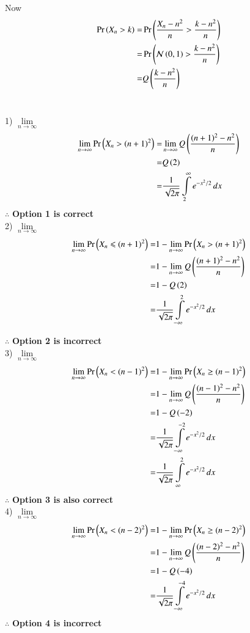 \documentclass[journal,12pt,twocolumn]{IEEEtran}
\begin{document}
Now 
{
\begin{align}
    \Pr\left(X_n>k\right) =& \Pr\left(\frac{X_n-n^2}{n}>\frac{k-n^2}{n}\right)
    \\=& \Pr\left(\mathcal{N}\left(0,1\right)>\frac{k-n^2}{n}\right)
    \\ =& Q\left(\frac{k-n^2}{n}\right)
    \label{eq-cdf}
\end{align}
}
\\[10ex]
{
\small
1) $\lim \limits_{n \to \infty} $ 
\begin{align}
    \lim \limits_{n \to \infty} \Pr\left(X_n > (n+1)^2\right) =& \lim \limits_{n \to \infty}Q \left(\frac{(n+1)^2-n^2}{n}\right)
    \\=&Q\left(2\right)
    \\=& {\frac{1}{\sqrt{2\pi}} \int \limits_{2}^{\infty} e^{-x^2/2}\,dx}
\end{align}
$\mathbf{\therefore}$ \textbf{Option 1 is correct}
\\[8ex]
2) $\lim \limits_{n \to \infty} $ 
\begin{align}
    \lim \limits_{n \to \infty}  \Pr\left(X_n \leqslant (n+1)^2\right) =&1-\lim \limits_{n \to \infty}  \Pr\left(X_n > (n+1)^2\right)
    \\=&1- \lim \limits_{n \to \infty}Q \left(\frac{(n+1)^2-n^2}{n}\right)
    \\=&1- Q \left(2\right)
    \\=& {\frac{1}{\sqrt{2\pi}} \int \limits_{-\infty}^{2} e^{-x^2/2}\,dx}
\end{align}

$\mathbf{\therefore}$ \textbf{Option 2 is incorrect}
\\[4ex]3) $\lim \limits_{n \to \infty} $ 
\begin{align}
    \lim \limits_{n \to \infty}  \Pr\left(X_n < (n-1)^2\right) =& 1-\lim \limits_{n \to \infty}  \Pr\left(X_n \geq (n-1)^2\right)
    \\=&1-\lim \limits_{n \to \infty}Q \left(\frac{(n-1)^2-n^2}{n}\right)
    \\=& 1-Q \left(-2\right)
    \\=& {\frac{1}{\sqrt{2\pi}} \int \limits_{-\infty}^{-2} e^{-x^2/2}\,dx}
    \\=& {\frac{1}{\sqrt{2\pi}} \int \limits_{\infty}^{2} e^{-x^2/2}\,dx}
\end{align}
$\mathbf{\therefore}$ \textbf{Option 3 is also correct}
\\[4ex]
4) $\lim \limits_{n \to \infty} $ 
\begin{align}
    \lim \limits_{n \to \infty}  \Pr\left(X_n < (n-2)^2\right) =& 1-\lim \limits_{n \to \infty}  \Pr\left(X_n \geq (n-2)^2\right)
    \\=&1-\lim \limits_{n \to \infty}Q \left(\frac{(n-2)^2-n^2}{n}\right)
    \\=&1- Q \left(-4\right)
    \\=& {\frac{1}{\sqrt{2\pi}} \int \limits_{-\infty}^{-4} e^{-x^2/2}\,dx}
\end{align}
$\mathbf{\therefore}$ \textbf{Option 4 is incorrect}
}%
\end{document}
